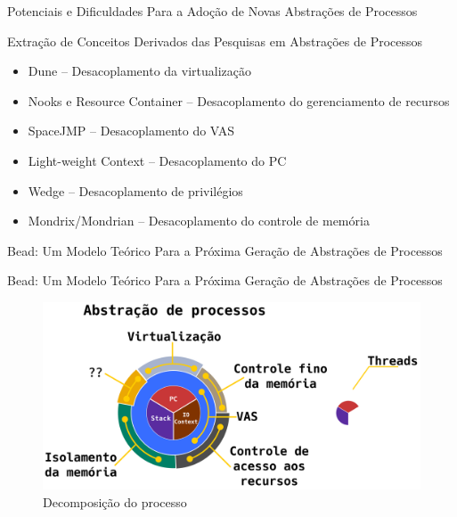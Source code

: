 \documentclass[xcolor={usenames,svgnames,dvipsnames},brazil,english,12pt,aspectratio=149]{beamer}
\begin{document}
\begin{frame}{Potenciais e Dificuldades Para a Adoção de Novas Abstrações de Processos}
  
\end{frame}

\begin{frame}{Extração de Conceitos Derivados das Pesquisas em Abstrações de Processos}
  \begin{itemize}
    \item Dune -- Desacoplamento da virtualização
    \item Nooks e Resource Container -- Desacoplamento do gerenciamento de recursos
    \item SpaceJMP -- Desacoplamento do VAS
    \item Light-weight Context -- Desacoplamento do PC
    \item Wedge -- Desacoplamento de privilégios
    \item Mondrix/Mondrian -- Desacoplamento do controle de memória
  \end{itemize}
\end{frame}

\begin{frame}{Bead: Um Modelo Teórico Para a Próxima Geração de Abstrações de Processos}
  
\end{frame}

\begin{frame}{Bead: Um Modelo Teórico Para a Próxima Geração de Abstrações de Processos}
  \begin{figure}[!h]
    \centering
    \includegraphics[width=\textwidth]{decomposicao_overview}
    \caption*{Decomposição do processo}
  \end{figure}
\end{frame}
\end{document}
